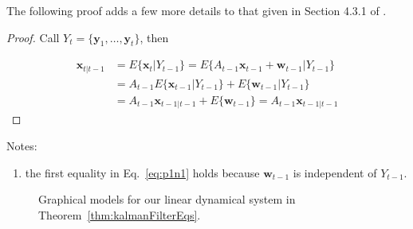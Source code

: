 \documentclass[12pt]{article}
\begin{document}
The following proof adds a few more details to that given in Section 4.3.1 of
\citet{durbinAndKoopman12}.

\begin{proof}
    Call $Y_t=\{\mathbf{y}_1,\ldots,\mathbf{y}_t\}$, then

    \begin{align}
        \mathbf{x}_{t|t-1}&=E\{\mathbf{x}_t|Y_{t-1}\}=E\{A_{t-1}\mathbf{x}_{t-1}+\mathbf{w}_{t-1}|Y_{t-1}\}\nonumber\\
                          &=A_{t-1}E\{\mathbf{x}_{t-1}|Y_{t-1}\}+E\{\mathbf{w}_{t-1}|Y_{t-1}\}\nonumber\\
                          &=A_{t-1}\mathbf{x}_{t-1|t-1}+E\{\mathbf{w}_{t-1}\}=A_{t-1}\mathbf{x}_{t-1|t-1}\label{eq:p1n1}
    \end{align}

\end{proof}

Notes:
\begin{enumerate}
    \item the first equality in Eq.~\ref{eq:p1n1} holds because
        $\mathbf{w}_{t-1}$ is independent of $Y_{t-1}$.
\end{enumerate}

\begin{figure}
    \centering
    
    \caption{Graphical models for our linear dynamical system in
    Theorem~\ref{thm:kalmanFilterEqs}.}
    \label{fig:ldsModel}
\end{figure}





\end{document}
